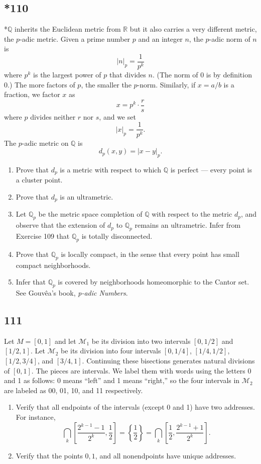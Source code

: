 \documentclass{amsart}
\begin{document}
\subsection*{*110}
*$\mathbb{Q}$ inherits the Euclidean metric from $\mathbb{R}$ but it also carries a very different metric, the $p$-adic metric. Given a prime number $p$ and an integer $n$, the $p$-adic norm of $n$ is
\[
|n|_p = \frac{1}{p^k}
\]
where $p^k$ is the largest power of $p$ that divides $n$. (The norm of $0$ is by definition $0$.) The more factors of $p$, the smaller the $p$-norm. Similarly, if $x = a/b$ is a fraction, we factor $x$ as
\[
x = p^k \cdot \frac{r}{s}
\]
where $p$ divides neither $r$ nor $s$, and we set
\[
|x|_p = \frac{1}{p^k}.
\]
The $p$-adic metric on $\mathbb{Q}$ is
\[
d_p(x,y) = |x-y|_p.
\]
\begin{enumerate}[label=(\alph*)]
\item Prove that $d_p$ is a metric with respect to which $\mathbb{Q}$ is perfect --- every point is a cluster point.
\item Prove that $d_p$ is an ultrametric.
\item Let $\mathbb{Q}_p$ be the metric space completion of $\mathbb{Q}$ with respect to the metric $d_p$, and observe that the extension of $d_p$ to $\mathbb{Q}_p$ remains an ultrametric. Infer from Exercise 109 that $\mathbb{Q}_p$ is totally disconnected.
\item Prove that $\mathbb{Q}_p$ is locally compact, in the sense that every point has small compact neighborhoods.
\item Infer that $\mathbb{Q}_p$ is covered by neighborhoods homeomorphic to the Cantor set. See Gouv\^ea's book, \emph{p-adic Numbers}.
\end{enumerate}

\subsection*{111}
Let $M=[0,1]$ and let $\mathcal{M}_1$ be its division into two intervals $[0,1/2]$ and $[1/2,1]$. Let $\mathcal{M}_2$ be its division into four intervals $[0,1/4]$, $[1/4,1/2]$, $[1/2,3/4]$, and $[3/4,1]$. Continuing these bisections generates natural divisions of $[0,1]$. The pieces are intervals. We label them with words using the letters 0 and 1 as follows: 0 means ``left'' and 1 means ``right,'' so the four intervals in $\mathcal{M}_2$ are labeled as 00, 01, 10, and 11 respectively.
\begin{enumerate}[label=(\alph*)]
\item Verify that all endpoints of the intervals (except 0 and 1) have two addresses. For instance,
\[
\bigcap_k \left[\frac{2^{k-1}-1}{2^k}, \frac{1}{2}\right] = \left\{\frac{1}{2}\right\} = \bigcap_k \left[\frac{1}{2}, \frac{2^{k-1}+1}{2^k}\right].
\]
\item Verify that the points $0, 1$, and all nonendpoints have unique addresses.
\end{enumerate}
\end{document}
